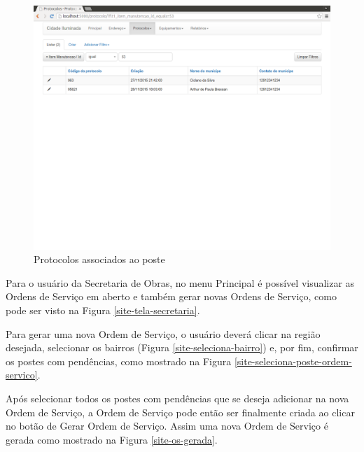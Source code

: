 \documentclass[
	article,			%
	11pt,				%
	oneside,			%
	a4paper,			%
	english,			%
	brazil,				%
	sumario=tradicional
	]{abntex2}
\begin{document}
\begin{figure}[!htbp]
 \centering
 \caption{\label{site-protocolos-poste}Protocolos associados ao poste}
 \includegraphics[scale=0.25]{site/6-protocolos_poste.png}
\end{figure}

\clearpage

Para o usuário da Secretaria de Obras, no menu Principal é possível visualizar as Ordens de Serviço em aberto e também gerar novas Ordens de Serviço, como pode ser visto na Figura \ref{site-tela-secretaria}.

Para gerar uma nova Ordem de Serviço, o usuário deverá clicar na região desejada, selecionar os bairros (Figura \ref{site-seleciona-bairro}) e, por fim, confirmar os postes com pendências, como mostrado na Figura \ref{site-seleciona-poste-ordem-servico}.

Após selecionar todos os postes com pendências que se deseja adicionar na nova Ordem de Serviço, a Ordem de Serviço pode então ser finalmente criada ao clicar no botão de Gerar Ordem de Serviço.
Assim uma nova Ordem de Serviço é gerada como mostrado na Figura \ref{site-os-gerada}.
\end{document}
